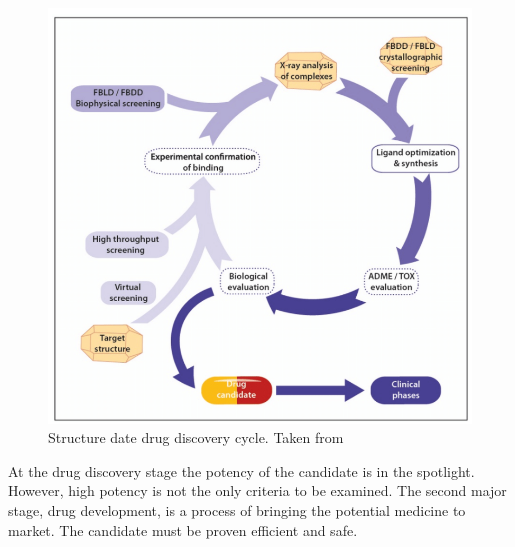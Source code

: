 

\begin{figure}
    \centering
    \includegraphics[scale = 0.4]{Images/Maveyraud.png}
    \caption{Structure date drug discovery cycle. Taken from \cite{Maveyraud2020ProteinDiscovery}}
    \label{DrugCycle}
\end{figure}


At the drug discovery stage the potency of the candidate is in the spotlight.
However, high potency is not the only criteria to be examined. 
The second major stage, drug development, is a process of bringing the potential medicine to market.
The candidate must be proven efficient and safe.\\ 



